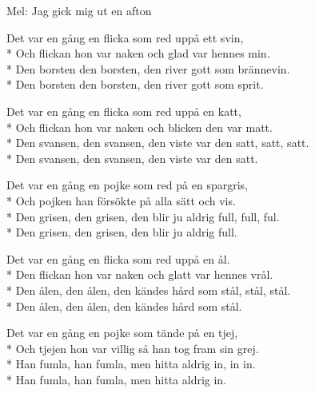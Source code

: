 \begin{SongText}
    \begin{SongInfo}
        Mel: Jag gick mig ut en afton
    \end{SongInfo}
    \begin{SongVerse}
        Det var en gång en flicka som red uppå ett svin,\\*%
        Och flickan hon var naken och glad var hennes min.\\*%
        Den borsten den borsten, den river gott som brännevin.\\*%
        Den borsten den borsten, den river gott som sprit.
    \end{SongVerse}
    \begin{SongVerse}
        Det var en gång en flicka som red uppå en katt,\\*%
        Och flickan hon var naken och blicken den var matt.\\*%
        Den svansen, den svansen, den viste var den satt, satt, satt.\\*%
        Den svansen, den svansen, den viste var den satt.
    \end{SongVerse}
    \begin{SongVerse}
        Det var en gång en pojke som red på en spargris,\\*%
        Och pojken han försökte på alla sätt och vis.\\*%
        Den grisen, den grisen, den blir ju aldrig full, full, ful.\\*%
        Den grisen, den grisen, den blir ju aldrig full.
    \end{SongVerse}
    \begin{SongVerse}
        Det var en gång en flicka som red uppå en ål.\\*%
        Den flickan hon var naken och glatt var hennes vrål.\\*%
        Den ålen, den ålen, den kändes hård som stål, stål, stål.\\*%
        Den ålen, den ålen, den kändes hård som stål.
    \end{SongVerse}
    \begin{SongVerse}
        Det var en gång en pojke som tände på en tjej,\\*%
        Och tjejen hon var villig så han tog fram sin grej.\\*%
        Han fumla, han fumla, men hitta aldrig in, in in.\\*%
        Han fumla, han fumla, men hitta aldrig in.
    \end{SongVerse}
\end{SongText}

